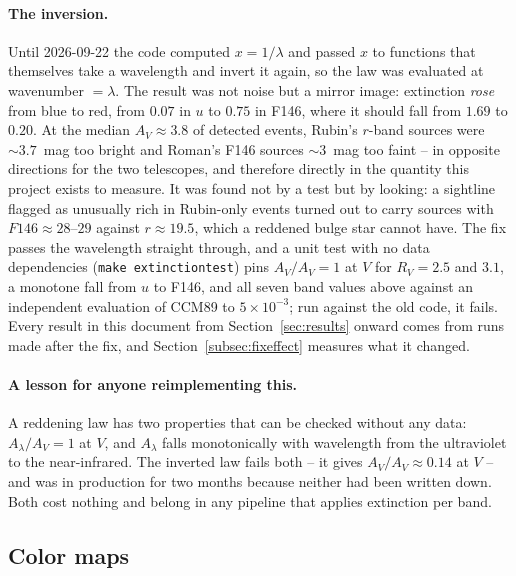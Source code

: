 \documentclass[english,10pt,a4paper]{article}
\begin{document}
	\paragraph{The inversion.} Until 2026-09-22 the code computed $x = 1/\lambda$ and passed $x$ to functions that themselves take a wavelength and invert it again, so the law was evaluated at wavenumber $=\lambda$. The result was not noise but a mirror image: extinction \emph{rose} from blue to red, from $0.07$ in $u$ to $0.75$ in F146, where it should fall from $1.69$ to $0.20$. At the median $A_V \approx 3.8$ of detected events, Rubin's $r$-band sources were $\sim\!3.7$~mag too bright and Roman's F146 sources $\sim\!3$~mag too faint -- in opposite directions for the two telescopes, and therefore directly in the quantity this project exists to measure. It was found not by a test but by looking: a sightline flagged as unusually rich in Rubin-only events turned out to carry sources with $F146 \approx 28$--$29$ against $r \approx 19.5$, which a reddened bulge star cannot have. The fix passes the wavelength straight through, and a unit test with no data dependencies (\texttt{make extinctiontest}) pins $A_V/A_V = 1$ at $V$ for $R_V=2.5$ and $3.1$, a monotone fall from $u$ to F146, and all seven band values above against an independent evaluation of CCM89 to $5\times10^{-3}$; run against the old code, it fails. Every result in this document from Section~\ref{sec:results} onward comes from runs made after the fix, and Section~\ref{subsec:fixeffect} measures what it changed.

	\paragraph{A lesson for anyone reimplementing this.} A reddening law has two properties that can be checked without any data: $A_\lambda/A_V = 1$ at $V$, and $A_\lambda$ falls monotonically with wavelength from the ultraviolet to the near-infrared. The inverted law fails both -- it gives $A_V/A_V \approx 0.14$ at $V$ -- and was in production for two months because neither had been written down. Both cost nothing and belong in any pipeline that applies extinction per band.

	\subsection{Color maps}
\end{document}
